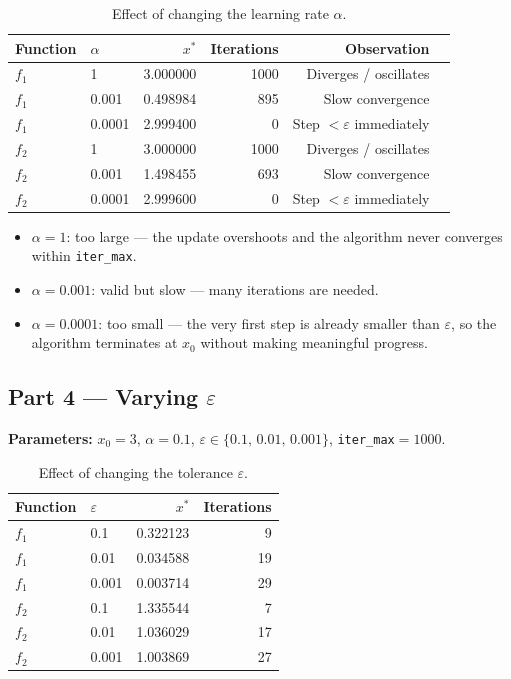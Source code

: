 \documentclass[11pt, letterpaper]{article}
\begin{document}
\begin{table}[H]
\centering
\caption{Effect of changing the learning rate $\alpha$.}
\begin{tabular}{llrrrr}
\toprule
Function & $\alpha$ & $x^*$ & Iterations & Observation \\
\midrule
$f_1$ & 1      & 3.000000 & 1000 & Diverges / oscillates \\
$f_1$ & 0.001  & 0.498984 &  895 & Slow convergence \\
$f_1$ & 0.0001 & 2.999400 &    0 & Step $<\varepsilon$ immediately \\
$f_2$ & 1      & 3.000000 & 1000 & Diverges / oscillates \\
$f_2$ & 0.001  & 1.498455 &  693 & Slow convergence \\
$f_2$ & 0.0001 & 2.999600 &    0 & Step $<\varepsilon$ immediately \\
\bottomrule
\end{tabular}
\end{table}

\begin{itemize}
  \item $\alpha=1$: too large — the update overshoots and the algorithm
        never converges within \texttt{iter\_max}.
  \item $\alpha=0.001$: valid but slow — many iterations are needed.
  \item $\alpha=0.0001$: too small — the very first step is already smaller
        than $\varepsilon$, so the algorithm terminates at $x_0$ without
        making meaningful progress.
\end{itemize}

\subsection{Part 4 — Varying $\varepsilon$}

\textbf{Parameters:} $x_0=3$, $\alpha=0.1$,
$\varepsilon\in\{0.1,\,0.01,\,0.001\}$, \texttt{iter\_max}$=1000$.

\begin{table}[H]
\centering
\caption{Effect of changing the tolerance $\varepsilon$.}
\begin{tabular}{llrr}
\toprule
Function & $\varepsilon$ & $x^*$ & Iterations \\
\midrule
$f_1$ & 0.1   & 0.322123 &  9 \\
$f_1$ & 0.01  & 0.034588 & 19 \\
$f_1$ & 0.001 & 0.003714 & 29 \\
$f_2$ & 0.1   & 1.335544 &  7 \\
$f_2$ & 0.01  & 1.036029 & 17 \\
$f_2$ & 0.001 & 1.003869 & 27 \\
\bottomrule
\end{tabular}
\end{table}
\end{document}

